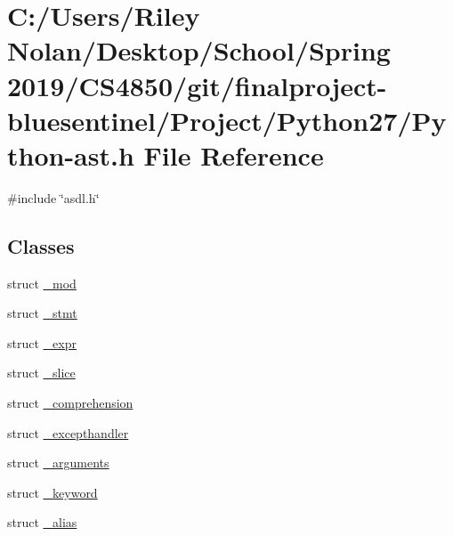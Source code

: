 \hypertarget{_python-ast_8h}{}\section{C\+:/\+Users/\+Riley Nolan/\+Desktop/\+School/\+Spring 2019/\+C\+S4850/git/finalproject-\/bluesentinel/\+Project/\+Python27/\+Python-\/ast.h File Reference}
\label{_python-ast_8h}
{\ttfamily \#include \char`\"{}asdl.\+h\char`\"{}}\newline
\subsection*{Classes}
\begin{DoxyCompactItemize}
\item 
struct \mbox{\hyperlink{struct__mod}{\+\_\+mod}}
\item 
struct \mbox{\hyperlink{struct__stmt}{\+\_\+stmt}}
\item 
struct \mbox{\hyperlink{struct__expr}{\+\_\+expr}}
\item 
struct \mbox{\hyperlink{struct__slice}{\+\_\+slice}}
\item 
struct \mbox{\hyperlink{struct__comprehension}{\+\_\+comprehension}}
\item 
struct \mbox{\hyperlink{struct__excepthandler}{\+\_\+excepthandler}}
\item 
struct \mbox{\hyperlink{struct__arguments}{\+\_\+arguments}}
\item 
struct \mbox{\hyperlink{struct__keyword}{\+\_\+keyword}}
\item 
struct \mbox{\hyperlink{struct__alias}{\+\_\+alias}}
\end{DoxyCompactItemize}
